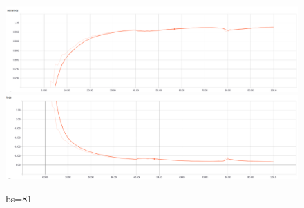 \documentclass[,table,dvipsnames]{article}
\begin{document}
\begin{figure}[h!]
	\centering
	\caption{bs=81}
	\includegraphics[width=\textwidth]{acc_log-model_1AG-gsbb_2C1-bs81-xyz-color_1norm-2048-mat}
	\includegraphics[width=\textwidth]{loss_log-model_1AG-gsbb_2C1-bs81-xyz-color_1norm-2048-mat}
\end{figure}
\end{document}
